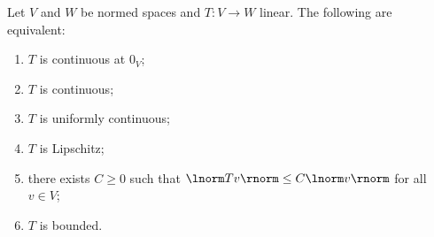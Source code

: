     \begin{proposition}
        Let $V$ and $W$ be normed spaces and $T:V \rightarrow W$ linear. The following are equivalent:
            \begin{enumerate}[label = (\arabic*),itemsep=1pt,topsep=3pt]
                \item $T$ is continuous at $0_V$;
                \item $T$ is continuous;
                \item $T$ is uniformly continuous;
                \item $T$ is Lipschitz;
                \item there exists $C \geq 0$ such that $\lnorm Tv \rnorm \leq C \lnorm v \rnorm$ for all $v \in V$;
                \item $T$ is bounded.
            \end{enumerate}
    \end{proposition}
